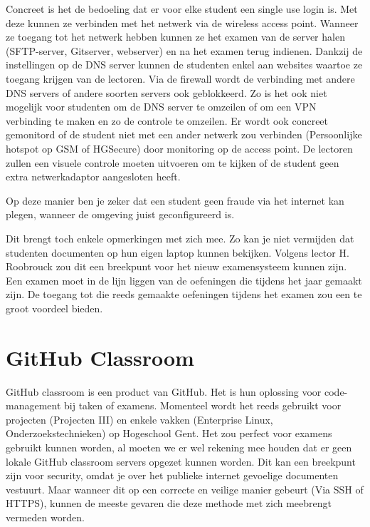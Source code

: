 Concreet is het de bedoeling dat er voor elke student een single use login is. Met deze kunnen ze verbinden met het netwerk via de wireless access point. Wanneer ze toegang tot het netwerk hebben kunnen ze het examen van de server halen (SFTP-server, Gitserver, webserver) en na het examen terug indienen. Dankzij de instellingen op de DNS server kunnen de studenten enkel aan websites waartoe ze toegang krijgen van de lectoren. Via de firewall wordt de verbinding met andere DNS servers of andere soorten servers ook geblokkeerd. Zo is het ook niet mogelijk voor studenten om de DNS server te omzeilen of om een VPN verbinding te maken en zo de controle te omzeilen. Er wordt ook concreet gemonitord of de student niet met een ander netwerk zou verbinden (Persoonlijke hotspot op GSM of HGSecure) door monitoring op de access point. De lectoren zullen een visuele controle moeten uitvoeren om te kijken of de student geen extra netwerkadaptor aangesloten heeft. 

Op deze manier ben je zeker dat een student geen fraude via het internet kan plegen, wanneer de omgeving juist geconfigureerd is.

Dit brengt toch enkele opmerkingen met zich mee. Zo kan je niet vermijden dat studenten documenten op hun eigen laptop kunnen bekijken. Volgens lector H. Roobrouck zou dit een breekpunt voor het nieuw examensysteem kunnen zijn. Een examen moet in de lijn liggen van de oefeningen die tijdens het jaar gemaakt zijn. De toegang tot die reeds gemaakte oefeningen tijdens het examen zou een te groot voordeel bieden. 




\section{GitHub Classroom}
\label{sec:GHC}

GitHub classroom is een product van GitHub. Het is hun oplossing voor code-management bij taken of examens. Momenteel wordt het reeds gebruikt voor projecten (Projecten III) en enkele vakken (Enterprise Linux, Onderzoekstechnieken) op Hogeschool Gent. Het zou perfect voor examens gebruikt kunnen worden, al moeten we er wel rekening mee houden dat er geen lokale GitHub classroom servers opgezet kunnen worden. Dit kan een breekpunt zijn voor security, omdat je over het publieke internet gevoelige documenten vestuurt. Maar wanneer dit op een correcte en veilige manier gebeurt (Via SSH of HTTPS), kunnen de meeste  gevaren die deze methode met zich meebrengt vermeden worden. 

